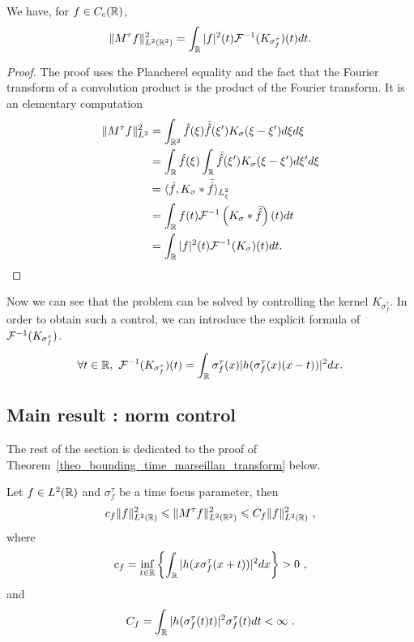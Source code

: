 \begin{corollary}
	We have, for $f\in C_c(\mathbb{R})$,
	\begin{equation}
		\|M^\tau f\|_{L^2(\mathbb{R}^2)}^2 = \int_{\mathbb{R}} |f|^2(t)\mathcal{F}^{-1}(K_{\sigma_f^\tau})(t) dt.
	\end{equation}
\end{corollary}
\begin{proof}
	The proof uses the Plancherel equality and the fact that the Fourier transform of a convolution product is the product of the Fourier transform. It is an elementary computation
	\begin{align*}
		\|M^\tau f\|_{L^2}^2  &= \int_{\mathbb{R}^2} \hat{f}(\xi)\bar{\hat{f}}(\xi') K_{\sigma}(\xi-\xi') d\xi d\xi \\
		& = \int_{\mathbb{R}} \hat{f}(\xi) \int_{\mathbb{R}} \bar{\hat{f}}(\xi')K_\sigma(\xi-\xi')d\xi' d\xi \\
		& = \langle \hat{f} , K_\sigma \ast \bar{\hat{f}} \rangle_{L^2_\xi} \\
		& = \int_{\mathbb{R}} f(t) \mathcal{F}^{-1}\left( K_\sigma \ast \bar{\hat{f}} \right)(t) dt \\
		& = \int_{\mathbb{R}} |f|^2(t)\mathcal{F}^{-1}(K_\sigma)(t)dt. 
	\end{align*}
\end{proof}

Now we can see that the problem can be solved by controlling the kernel $K_{\sigma_f^\tau}$. In order to obtain such a control, we can introduce the explicit formula of $\mathcal{F}^{-1}(K_{\sigma_f^\tau})$.
\begin{equation}\label{eq_formula_inverse_fourier_kernel}
		\forall t\in\mathbb{R}, \ \mathcal{F}^{-1}(K_{\sigma_f^\tau})(t) = \int_{\mathbb{R}} \sigma_f^\tau(x)|h(\sigma_f^\tau(x)(x-t))|^2dx.
\end{equation}


\subsection{Main result : norm control}

The rest of the section is dedicated to the proof of Theorem~\ref{theo_bounding_time_marseillan_transform} below.


\begin{theorem}\label{theo_bounding_time_marseillan_transform}
	Let $f\in L^2(\mathbb{R})$ and $\sigma_f^\tau$ be a time focus parameter, then
	\begin{equation}
		c_f \|f\|_{L^2(\mathbb{R})}^2 \leqslant\| M^\tau f\|_{L^2(\mathbb{R}^2)}^2 \leqslant C_f \|f\|_{L^2(\mathbb{R})}^2\ ,
	\end{equation} 
	where
	\begin{equation}
		c_f = \inf_{t\in\mathbb{R}}\left\{ \int_{\mathbb{R}}|h(x\sigma_f^\tau(x+t))|^2 dx \right\}>0 \ ,
	\end{equation}
	and
	\begin{equation}
		C_f = \int_{\mathbb{R}} |h(\sigma_f^\tau(t)t)|^2\sigma_f^\tau(t)dt < \infty \ .
	\end{equation}
\end{theorem}

